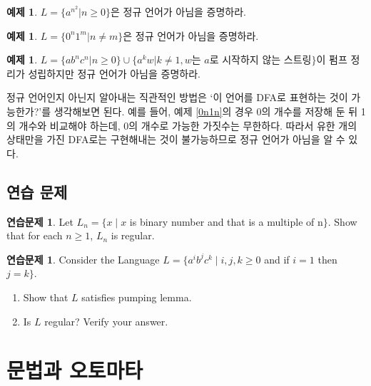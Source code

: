 \documentclass[b5paper, 10pt]{book}
\theoremstyle{definition}
\newtheorem{ex}[defn]{예제}
\newtheorem{ec}[defn]{연습문제}
\begin{document}
\begin{ex}
    $L = \{a^{n^2} \vert n \ge 0\}$은 정규 언어가 아님을 증명하라.
\end{ex}
\begin{ex}
     $L = \{0^n 1^m \vert n \neq m\}$은 정규 언어가 아님을 증명하라.
\end{ex}
\begin{ex} 
    $L = \{ab^nc^n \vert n \ge 0\} \cup 
\{ a^k w \vert k \neq 1, w\text{는 } a\text{로 시작하지 않는 스트링} \}$이 펌프 정리가 성립하지만
정규 언어가 아님을 증명하라.
\end{ex}
정규 언어인지 아닌지 알아내는 직관적인 방법은 `이 언어를 DFA로 표현하는 것이 가능한가?'를
생각해보면 된다. 예를 들어, 예제 \ref{0n1n}의 경우 0의 개수를 저장해 둔 뒤 1의 개수와 비교해야 하는데,
0의 개수로 가능한 가짓수는 무한하다. 따라서 유한 개의 상태만을 가진 DFA로는 구현해내는 것이
불가능하므로 정규 언어가 아님을 알 수 있다. 

\section{연습 문제}
\begin{ec}
    Let $L_n = \{x \;\vert\; x$ is binary number and that is a multiple 
    of n$\}$. Show that for each $n\ge 1$, $L_n$ is regular. 
\end{ec}
\begin{ec}
    Consider the Language $L= \{a^i b^j c^k \;\vert\; i, j, k \ge 0$ 
    and if $i = 1$ then $j=k\}$.
    \begin{enumerate}
        \item Show that $L$ satisfies pumping lemma.
        \item Is $L$ regular? Verify your answer.
    \end{enumerate}
\end{ec}
\chapter{문법과 오토마타} 
\end{document}
